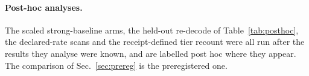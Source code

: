 \documentclass[aps,pra,twocolumn,superscriptaddress,nofootinbib,longbibliography,floatfix]{revtex4-2}
\begin{document}
\paragraph*{Post-hoc analyses.} The scaled strong-baseline arms, the held-out re-decode of Table~\ref{tab:posthoc}, the declared-rate scans and the receipt-defined tier recount were all run after the results they analyse were known, and are labelled post hoc where they appear. The comparison of Sec.~\ref{sec:prereg} is the preregistered one.


\end{document}
